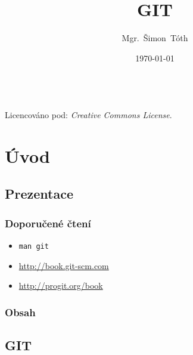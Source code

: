

\title{GIT}
\author[]{Mgr.~Šimon~Tóth}
\date{\today}

\newcommand{\CcNote}[1]{%
        Licencováno pod: \textit{Creative Commons #1 3.0 License}.%
}

\usepackage{tikz}
\usetikzlibrary{chains,fit,shapes}




\begin{frame}
\titlepage
	\vfill
	\begin{center}
		\\ {\tiny\CcNote{\CcLongnameByNcSa}}
		\vspace*{2ex}
	\end{center}
\end{frame}

\section{Úvod}
\subsection*{Prezentace}

\begin{frame}
	\frametitle{Doporučené čtení}
	\begin{itemize}
		\item{\texttt{man git}}
		\item{\url{http://book.git-scm.com}}
		\item{\url{http://progit.org/book}}
	\end{itemize}
\end{frame}

\begin{frame}
	\frametitle{Obsah}
	\tableofcontents
\end{frame}

\subsection{GIT}

